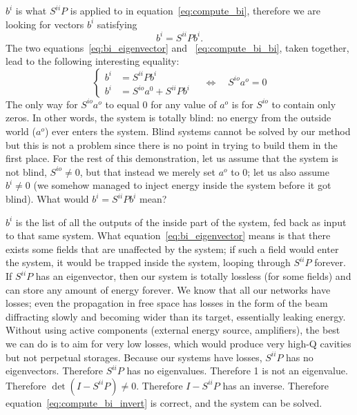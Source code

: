 $b^i$ is what $S^{ii}P$ is applied to in equation~\eqref{eq:compute_bi}, therefore we are looking for vectors $b^i$ satisfying
\begin{equation}
    b^i = S^{ii}P b^i \text{.} \label{eq:bi_eigenvector}
\end{equation}
The two equations~\eqref{eq:bi_eigenvector} and ~\eqref{eq:compute_bi_bi}, taken together, 
lead to the following interesting equality:
\begin{equation}
    \left\lbrace
        \begin{aligned}
            b^i &= S^{ii}P b^i \\
            b^i &= S^{io}a^0 + S^{ii}P b^i
        \end{aligned}
    \right.
    \quad
    \Longleftrightarrow
    \quad
    S^{io}a^o = 0
\end{equation}
The only way for $S^{io}a^o$ to equal 0 for any value of $a^o$ is for $S^{io}$ to contain only zeros.
In other words, the system is totally blind: no energy from the outside world ($a^o$) ever enters the system.
Blind systems cannot be solved by our method but this is not a problem since there is no point in trying to build them in the first place.
For the rest of this demonstration, let us assume that the system is not blind, $S^{io}\neq 0$, but that instead we merely set $a^o$ to 0; let us also assume $b^i \neq 0$ (we somehow managed to inject energy inside the system before it got blind).
What would $b^i = S^{ii}P b^i$ mean?

$b^i$ is the list of all the outputs of the inside part of the system, fed back as input to that same system.
What equation~\eqref{eq:bi_eigenvector} means is that there exists some fields that are unaffected by the system; if such a field would enter the system, it would be trapped inside the system, looping through $S^{ii}P$ forever.
If $S^{ii}P$ has an eigenvector, then our system is totally lossless (for some fields) and can store any amount of energy forever.
We know that all our networks have losses; even the propagation in free space has losses in the form of the beam diffracting slowly and becoming wider than its target, essentially leaking energy.
Without using active components (external energy source, amplifiers), the best we can do is to aim for very low losses, which would produce very high-Q cavities but not perpetual storages.
Because our systems have losses, $S^{ii}P$ has no eigenvectors.
Therefore $S^{ii}P$ has no eigenvalues.
Therefore 1 is not an eigenvalue.
Therefore $\det(I-S^{ii}P) \neq 0$.
Therefore $I-S^{ii}P$ has an inverse.
Therefore equation~\eqref{eq:compute_bi_invert} is correct, and the system can be solved.

